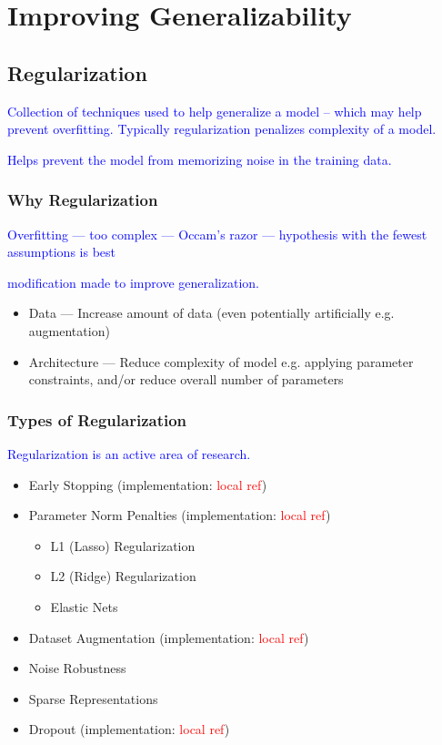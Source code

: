 \section{Improving Generalizability}

\subsection{Regularization}

\textcolor{blue}{Collection of techniques used to help generalize a model -- which may help prevent overfitting. Typically regularization penalizes complexity of a model.}


\textcolor{blue}{Helps prevent the model from memorizing noise in the training data.}


\subsubsection{Why Regularization}

\textcolor{blue}{Overfitting --- too complex --- Occam's razor --- hypothesis with the fewest assumptions is best}

\textcolor{blue}{modification made to improve generalization.}

\begin{itemize}
	\item Data --- Increase amount of data (even potentially artificially e.g. augmentation)
	\item Architecture --- Reduce complexity of model e.g. applying parameter constraints, and/or reduce overall number of parameters
\end{itemize}


\subsubsection{Types of Regularization}

\textcolor{blue}{Regularization is an active area of research.}

\begin{itemize}
	\item Early Stopping (implementation: \textcolor{red}{local ref})
	\item Parameter Norm Penalties (implementation: \textcolor{red}{local ref})
	\begin{itemize}
		\item L1 (Lasso) Regularization
		\item L2 (Ridge) Regularization
		\item Elastic Nets
	\end{itemize}
	\item Dataset Augmentation (implementation: \textcolor{red}{local ref})
	\item Noise Robustness
	\item Sparse Representations
	\item Dropout (implementation: \textcolor{red}{local ref})
\end{itemize}


